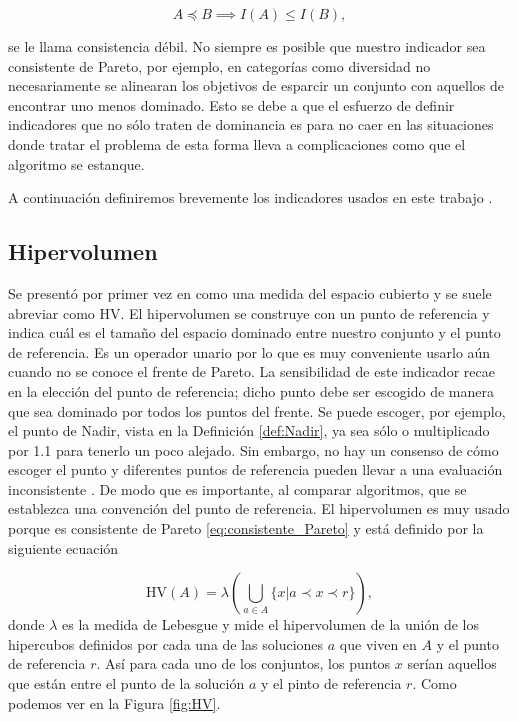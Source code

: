 \begin{equation} \label{eq:consistente_debil_Pareto}
    A \preceq B \implies I(A)\leq I(B),
\end{equation}

se le llama consistencia débil. No siempre es posible que nuestro indicador sea consistente de Pareto, por ejemplo, en categorías como diversidad no necesariamente se alinearan los objetivos de esparcir un conjunto con aquellos de encontrar uno menos dominado. Esto se debe a que el esfuerzo de definir indicadores que no sólo traten de dominancia es para no caer en las situaciones donde tratar el problema de esta forma lleva a complicaciones como que el algoritmo se estanque.

A continuación definiremos brevemente los indicadores usados en este trabajo .

\subsection{Hipervolumen} \label{sec:HV}

Se presentó por primer vez en \cite{zitzlerMultiobjectiveOptimizationUsing1998} como una medida del espacio cubierto y se suele abreviar como HV. 
El hipervolumen se construye con un punto de referencia y indica cuál es el tamaño del espacio dominado entre nuestro conjunto y el punto de referencia. Es un operador unario por lo que es muy conveniente usarlo aún cuando no se conoce el frente de Pareto. La sensibilidad de este indicador recae en la elección del punto de referencia; dicho  punto debe ser escogido de manera que sea dominado por todos los puntos del frente. Se puede escoger, por ejemplo, el punto de Nadir, vista en la Definición \ref{def:Nadir}, ya sea sólo o multiplicado por 1.1 para tenerlo un poco alejado. Sin embargo, no hay un consenso de cómo escoger el punto y diferentes puntos de referencia pueden llevar a una evaluación inconsistente \cite{HV_ref_point}. De modo que es importante, al comparar algoritmos, que se establezca una convención del punto de referencia. El hipervolumen es muy usado porque es consistente de Pareto \eqref{eq:consistente_Pareto} y está definido por la siguiente ecuación 

\begin{equation} \label{eq:HV}
    \text{HV}(A)=\lambda\left( \bigcup_{a\in A} \{x|a \prec x \prec r \} \right), \nonumber
\end{equation}
donde $\lambda$ es la medida de Lebesgue y mide el hipervolumen de la unión de los hipercubos definidos por cada una de las soluciones $a$ que viven en $A$ y el punto de referencia $r$. Así para cada uno de los conjuntos, los puntos $x$ serían aquellos que están entre el punto de la solución $a$ y el pinto de referencia $r$. Como podemos ver en la Figura \ref{fig:HV}.

